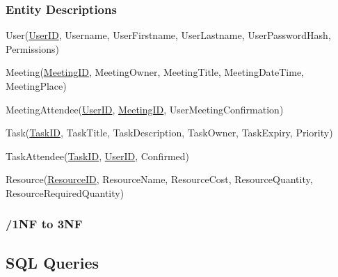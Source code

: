\subsubsection{Entity Descriptions}
User(\underline{UserID}, Username, UserFirstname, UserLastname, UserPasswordHash, Permissions)

Meeting(\underline{MeetingID}, MeetingOwner, MeetingTitle, MeetingDateTime, MeetingPlace)

MeetingAttendee(\underline{UserID}, \underline{MeetingID}, UserMeetingConfirmation)

Task(\underline{TaskID}, TaskTitle, TaskDescription, TaskOwner, TaskExpiry, Priority)

TaskAttendee(\underline{TaskID}, \underline{UserID}, Confirmed)

Resource(\underline{ResourceID}, ResourceName, ResourceCost, ResourceQuantity, ResourceRequiredQuantity)

\subsubsection{/1NF to 3NF}


\subsection{SQL Queries}

